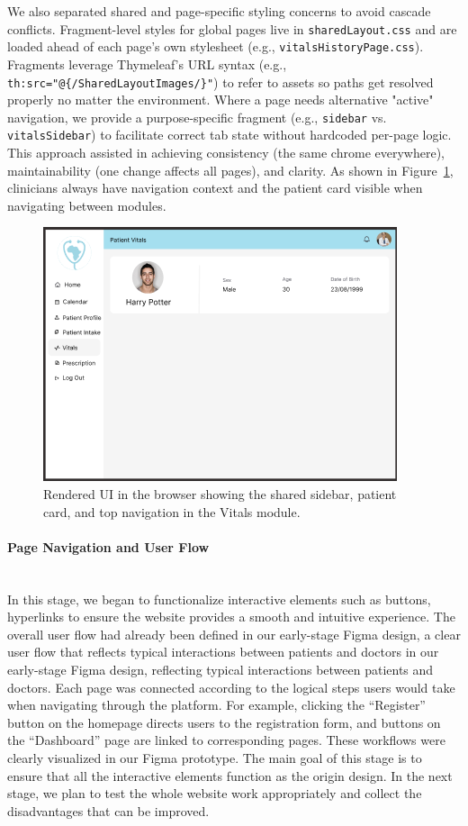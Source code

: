 We also separated shared and page-specific styling concerns to avoid cascade conflicts. Fragment-level styles for global pages live in \verb|sharedLayout.css| and are loaded ahead of each page's own stylesheet (e.g., \verb|vitalsHistoryPage.css|). Fragments leverage Thymeleaf's URL syntax (e.g., \verb|th:src="@{/SharedLayoutImages/}"|) to refer to assets so paths get resolved properly no matter the environment. Where a page needs alternative "active" navigation, we provide a purpose-specific fragment (e.g., \verb|sidebar| vs. \verb|vitalsSidebar|) to facilitate correct tab state without hardcoded per-page logic. This approach assisted in achieving consistency (the same chrome everywhere), maintainability (one change affects all pages), and clarity. As shown in Figure~\ref{fig:3-2-2-renderLayout}, clinicians always have navigation context and the patient card visible when navigating between modules.

\begin{figure}[H]
  \centering
  \includegraphics[width=0.8\linewidth]{images03/3-2-2-renderLayout.png}
  \caption{Rendered UI in the browser showing the shared sidebar, patient card, and top navigation in the Vitals module.}
  \label{fig:3-2-2-renderLayout}
\end{figure}

\paragraph{Page Navigation and User Flow}\mbox{}\\
In this stage, we began to functionalize interactive elements such as buttons, hyperlinks to ensure the website provides a smooth and intuitive experience. The overall user flow had already been defined in our early-stage Figma design, a clear user flow that reflects typical interactions between patients and doctors in our early-stage Figma design, reflecting typical interactions between patients and doctors. Each page was connected according to the logical steps users would take when navigating through the platform. For example, clicking the “Register” button on the homepage directs users to the registration form, and buttons on the “Dashboard” page are linked to corresponding pages. These workflows were clearly visualized in our Figma prototype. The main goal of this stage is to ensure that all the interactive elements function as the origin design. In the next stage, we plan to test the whole website work appropriately and collect the disadvantages that can be improved.
